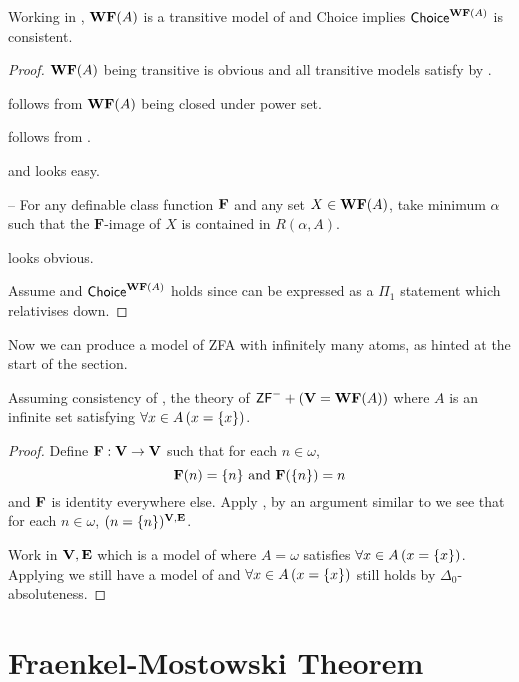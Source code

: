 \begin{lemma} \label{WFfromA}
    Working in \ZFminus, \(\mathbf{WF}(A)\) is a transitive model of \ZFminus and {\normalfont\textsf{Choice}} implies \({\normalfont\textsf{Choice}}^{\mathbf{WF}(A)}\) is consistent.
\end{lemma}
\begin{proof}
    \(\mathbf{WF}(A)\) being transitive is obvious and all transitive models satisfy  by .

     follows from \(\mathbf{WF}(A)\) being closed under power set.

     follows from .

     and  looks easy.

     -- For any definable class function \(\mathbf{F}\) and any set \(X\in\mathbf{WF}(A)\), take minimum \(\alpha\) such that the \(\mathbf{F}\)-image of \(X\) is contained in \(R(\alpha, A)\).

     looks obvious.

    Assume  and \({\normalfont\textsf{Choice}}^{\mathbf{WF}(A)}\) holds since  can be expressed as a \(\Pi_1\) statement which relativises down.
\end{proof}

Now we can produce a model of \textsf{ZFA} with infinitely many atoms, as hinted at the start of the section.
\begin{theorem}
    Assuming consistency of \ZFminus, the theory of \(\mbox{\normalfont \textsf{ZF}}^- + (\mathbf{V}=\mathbf{WF}(A))\) where \(A\) is an infinite set satisfying \(\forall x\in A\left(x = {\left\{ x \right\}}\right)\).
\end{theorem}
\begin{proof}
    Define \(\mathbf{F}:\mathbf{V}\to\mathbf{V}\) such that for each \(n\in\omega\),
    \[ \mathbf{F}(n) = {\left\{ n \right\}} \text{ and } \mathbf{F}({\left\{ n \right\}}) = n \]
    and \(\mathbf{F}\) is identity everywhere else.
    Apply , by an argument similar to  we see that for each \(n\in\omega\), \((n = {\left\{ n \right\}})^{\mathbf{V},\mathbf{E}}\).

    Work in \(\mathbf{V},\mathbf{E}\) which is a model of \ZFminus where \(A = \omega\) satisfies \(\forall x\in A\left(x = {\left\{ x \right\}}\right)\).
    Applying  we still have a model of \ZFminus and \(\forall x\in A\left(x = {\left\{ x \right\}}\right)\) still holds by \(\Delta_0\)-absoluteness.
\end{proof}

\section{Fraenkel-Mostowski Theorem}

